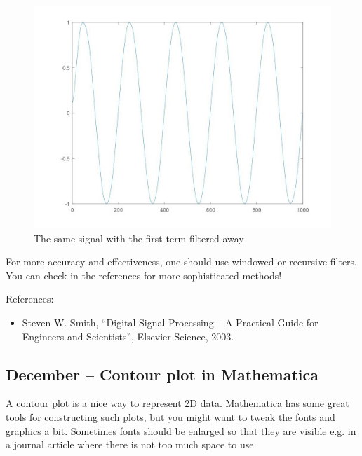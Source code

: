\documentclass{article}
\begin{document}
\begin{figure}
  \includegraphics[width=\linewidth]{filtered.jpg}
  \caption{The same signal with the first term filtered away}
\end{figure}





For more accuracy and effectiveness, one should use windowed or recursive filters. You can check in the references for more sophisticated methods!


References:
\begin{itemize}
\item Steven W. Smith, ``Digital Signal Processing – A Practical Guide for Engineers and Scientists'', Elsevier Science, 2003.
\end{itemize}


\subsection{December – Contour plot in Mathematica}

A contour plot is a nice way to represent 2D data. Mathematica has some great tools for constructing such plots, but you might want to tweak the fonts and graphics a bit. Sometimes fonts should be enlarged so that they are visible e.g. in a journal article where there is not too much space to use.
\end{document}
